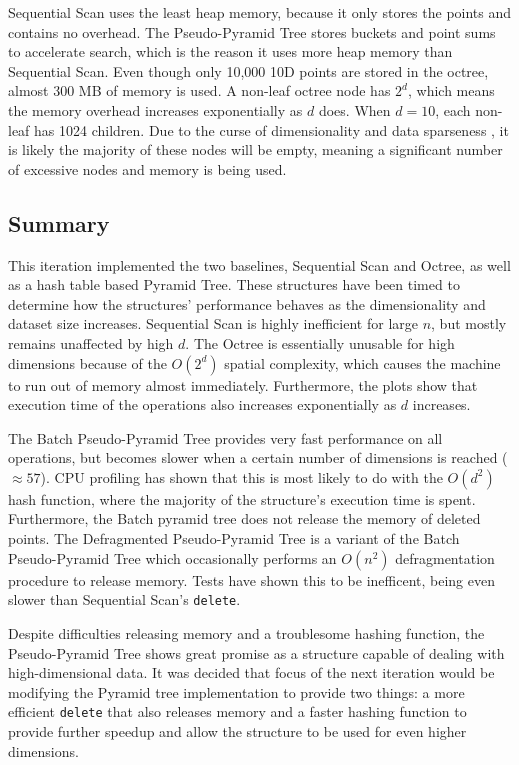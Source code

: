 Sequential Scan uses the least heap memory, because it only stores the points and contains no overhead. The Pseudo-Pyramid Tree stores buckets and point sums to accelerate search, which is the reason it uses more heap memory than Sequential Scan. Even though only 10,000 10D points are stored in the octree, almost 300 MB of memory is used. A non-leaf octree node has $2^d$, which means the memory overhead increases exponentially as $d$ does. When $d = 10$, each non-leaf has 1024 children. Due to the curse of dimensionality and data sparseness \cite{data-sparseness}, it is likely the majority of these nodes will be empty, meaning a significant number of excessive nodes and memory is being used.

\subsection{Summary}

This iteration implemented the two baselines, Sequential Scan and Octree, as well as a hash table based Pyramid Tree. These structures have been timed to determine how the structures' performance behaves as the dimensionality and dataset size increases. Sequential Scan is highly inefficient for large $n$, but mostly remains unaffected by high $d$. The Octree is essentially unusable for high dimensions because of the $O(2^d)$ spatial complexity, which causes the machine to run out of memory almost immediately. Furthermore, the plots show that execution time of the operations also increases exponentially as $d$ increases.

The Batch Pseudo-Pyramid Tree provides very fast performance on all operations, but becomes slower when a certain number of dimensions is reached ($\approx 57$). CPU profiling has shown that this is most likely to do with the $O(d^2)$ hash function, where the majority of the structure's execution time is spent. Furthermore, the Batch pyramid tree does not release the memory of deleted points. The Defragmented Pseudo-Pyramid Tree is a variant of the Batch Pseudo-Pyramid Tree which occasionally performs an $O(n^2)$ defragmentation procedure to release memory. Tests have shown this to be inefficent, being even slower than Sequential Scan's \texttt{delete}.

Despite difficulties releasing memory and a troublesome hashing function, the Pseudo-Pyramid Tree shows great promise as a structure capable of dealing with high-dimensional data. It was decided that focus of the next iteration would be modifying the Pyramid tree implementation to provide two things: a more efficient \texttt{delete} that also releases memory and a faster hashing function to provide further speedup and allow the structure to be used for even higher dimensions.